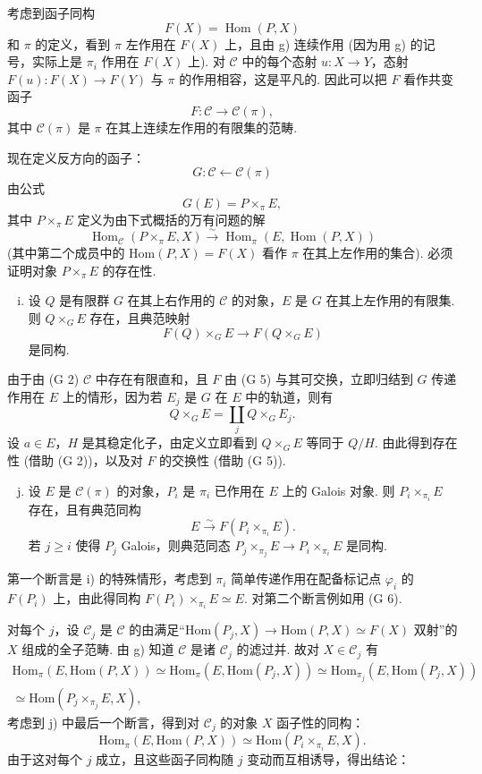 考虑到函子同构
\[
F(X) = \operatorname{Hom}(P, X)
\]
和 $\pi$ 的定义，看到 $\pi$ 左作用在 $F(X)$ 上，且由 g) 连续作用 (因为用 g) 的记号，实际上是 $\pi_i$ 作用在 $F(X)$ 上). 对 $\mathcal{C}$ 中的每个态射 $u \colon X \to Y$，态射 $F(u) \colon F(X) \to F(Y)$ 与 $\pi$ 的作用相容，这是平凡的. 因此可以把 $F$ 看作共变函子
\[
F \colon \mathcal{C} \longrightarrow \mathcal{C}(\pi),
\]
其中 $\mathcal{C}(\pi)$ 是 $\pi$ 在其上连续左作用的有限集的范畴.

现在定义反方向的函子：
\[
G \colon \mathcal{C} \longleftarrow \mathcal{C}(\pi)
\]
由公式
\[
G(E) = P \times_\pi E,
\]
其中 $P \times_\pi E$ 定义为由下式概括的万有问题的解
\[
\operatorname{Hom}_{\mathcal{C}}(P \times_\pi E, X) \xrightarrow{\sim} \operatorname{Hom}_\pi(E, \operatorname{Hom}(P, X))
\]
(其中第二个成员中的 $\mathrm{Hom}(P, X) = F(X)$ 看作 $\pi$ 在其上左作用的集合). 必须证明对象 $P \times_\pi E$ 的存在性.

\begin{enumerate}[a)]
\setcounter{enumi}{8}
\item 设 $Q$ 是有限群 $G$ 在其上右作用的 $\mathcal{C}$ 的对象，$E$ 是 $G$ 在其上左作用的有限集. 则 $Q \times_G E$ 存在，且典范映射
\[
F(Q) \times_G E \longrightarrow F(Q \times_G E)
\]
是同构.
\end{enumerate}

由于由 (G 2) $\mathcal{C}$ 中存在有限直和，且 $F$ 由 (G 5) 与其可交换，立即归结到 $G$ 传递作用在 $E$ 上的情形，因为若 $E_j$ 是 $G$ 在 $E$ 中的轨道，则有
\[
Q \times_G E = \coprod_{j} Q \times_G E_j.
\]
设 $a \in E$，$H$ 是其稳定化子，由定义立即看到 $Q \times_G E$ 等同于 $Q/H$. 由此得到存在性 (借助 (G 2))，以及对 $F$ 的交换性 (借助 (G 5)).

\begin{enumerate}[a)]
\setcounter{enumi}{9}
\item 设 $E$ 是 $\mathcal{C}(\pi)$ 的对象，$P_i$ 是 $\pi_i$ 已作用在 $E$ 上的 Galois 对象. 则 $P_i \times_{\pi_i} E$ 存在，且有典范同构
\[
E \stackrel{\sim}{\longrightarrow} F(P_i \times_{\pi_i} E).
\]
若 $j \geqslant i$ 使得 $P_j$ Galois，则典范同态 $P_j \times_{\pi_j} E \to P_i \times_{\pi_i} E$ 是同构.
\end{enumerate}

第一个断言是 i) 的特殊情形，考虑到 $\pi_i$ 简单传递作用在配备标记点 $\varphi_i$ 的 $F(P_i)$ 上，由此得同构 $F(P_i) \times_{\pi_i} E \simeq E$. 对第二个断言例如用 (G 6).

对每个 $j$，设 $\mathcal{C}_j$ 是 $\mathcal{C}$ 的由满足``$\mathrm{Hom}(P_j, X) \to \mathrm{Hom}(P, X) \simeq F(X)$ 双射''的 $X$ 组成的全子范畴. 由 g) 知道 $\mathcal{C}$ 是诸 $\mathcal{C}_j$ 的滤过并. 故对 $X \in \mathcal{C}_j$ 有
\[
\begin{array}{r}
\mathrm{Hom}_\pi(E, \mathrm{Hom}(P, X)) \simeq \mathrm{Hom}_\pi(E, \mathrm{Hom}(P_j, X)) \simeq \mathrm{Hom}_{\pi_j}(E, \mathrm{Hom}(P_j, X)) \\
\simeq \mathrm{Hom}(P_j \times_{\pi_j} E, X),
\end{array}
\]
考虑到 j) 中最后一个断言，得到对 $\mathcal{C}_j$ 的对象 $X$ 函子性的同构：
\[
\mathrm{Hom}_\pi(E, \mathrm{Hom}(P, X)) \simeq \mathrm{Hom}(P_i \times_{\pi_i} E, X).
\]
由于这对每个 $j$ 成立，且这些函子同构随 $j$ 变动而互相诱导，得出结论：

